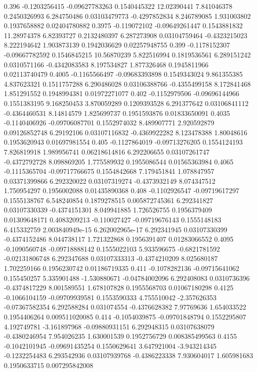{0.396 -0.1203256415 -0.09627783263 0.1540445322 12.02390441 7.841046378 0.2450326993 6.284750486 0.03103479773 -0.4297852834 8.246789085 1.931003802 0.1937658882 0.02404780882
0.3975 -0.119072102 -0.09649261447 0.1543881832 11.28974378 6.82393727 0.2132480397 6.287273908 0.03104759464 -0.4323215023 8.222194642 1.903873139 0.1942036629 0.02257948755
0.399 -0.1178152307 -0.09667782592 0.1546845215 10.56870239 5.822516994 0.1819536561 6.289151242 0.0310571166 -0.4342083583 8.197534827 1.877326468 0.1945811966 0.02113740479
0.4005 -0.1165566497 -0.09683393898 0.1549343024 9.861355385 4.837623321 0.1511757288 6.290486028 0.03106388766 -0.4355499158 8.172841468 1.851291552 0.1948994381 0.01972271077
0.402 -0.1152979506 -0.09696144966 0.1551383195 9.168250453 3.870059289 0.1209393528 6.291377642 0.03106841112 -0.4364460531 8.14814579 1.825699737 0.1951593876 0.01833650091
0.4035 -0.1140406926 -0.09706087701 0.1552974032 8.489907771 2.920592879 0.09126852748 6.29192106 0.03107116832 -0.4369922282 8.123478388 1.80048616 0.1953620943 0.01697981554
0.405 -0.1127864019 -0.09713276205 0.1554124193 7.826819918 1.989956741 0.06218614816 6.292206655 0.03107261747 -0.4372792728 8.098869205 1.775589932 0.1955086544 0.01565363984
0.4065 -0.1115365704 -0.09717766675 0.1554842668 7.179451841 1.078847957 0.03371399866 6.292320022 0.03107319274 -0.4373932149 8.074347512 1.750954297 0.1956002088 0.01435890368
0.408 -0.1102926547 -0.09719617297 0.1555138767 6.548240854 0.1879278515 0.005872745361 6.292341827 0.03107330339 -0.4374151301 8.049941885 1.726526755 0.1956379409 0.01309648171
0.4083209213 -0.110027427 -0.09719676143 0.1555148183 6.415332759 2.003840949e-15 6.262002965e-17 6.292341945 0.03107330399 -0.4374152486 8.044738117 1.721322868 0.1956391407 0.01283066552
0.4095 -0.1090560748 -0.09718888142 0.1555022103 5.933596675 -0.6821781592 -0.02131806748 6.292347688 0.03107333313 -0.4374210209 8.025680187 1.702259166 0.1956230742 0.01186719335
0.411 -0.1078282136 -0.09715641062 0.155450257 5.335901488 -1.530880671 -0.04784002096 6.292408083 0.0310736396 -0.4374817229 8.001589551 1.678107828 0.1955568703 0.01067180298
0.4125 -0.1066104159 -0.09709939581 0.1553590333 4.755510042 -2.357626353 -0.07367582354 6.292588284 0.031074554 -0.4376628382 7.97769636 1.654033522 0.1954406264 0.009511020085
0.414 -0.1054039875 -0.09701848794 0.1552295807 4.192749781 -3.161897968 -0.09880931151 6.292948315 0.03107638079 -0.4380246954 7.954026235 1.630001539 0.1952756729 0.008385499563
0.4155 -0.1042101945 -0.09691435254 0.1550629641 3.647921004 -3.943214345 -0.1232254483 6.293542936 0.03107939768 -0.4386223338 7.930604017 1.605981683 0.1950633715 0.007295842008
}
